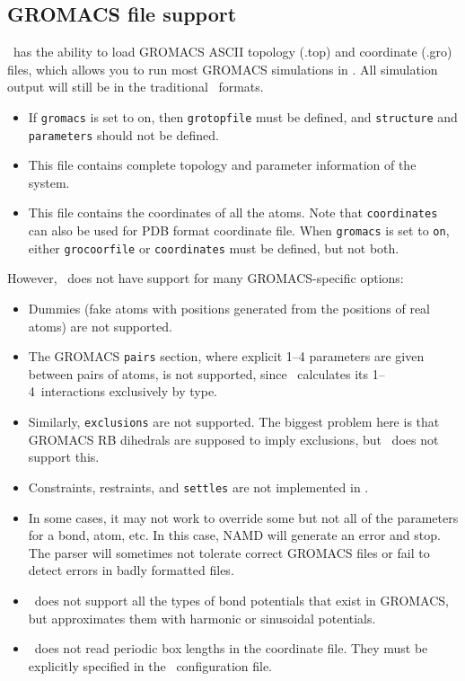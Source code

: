 \subsection{GROMACS file support}

\NAMD\ has the ability to load GROMACS ASCII topology (.top) and
coordinate (.gro) files, which allows you to run most GROMACS
simulations in \NAMD.  All simulation output will still be in the
traditional \NAMD\ formats.

\begin{itemize}
\item
{}
{
If {\tt gromacs} is set to on, then {\tt grotopfile} must be defined,
and {\tt structure} and {\tt parameters} should not be defined.
}
\item
{}
{
This file contains complete topology and parameter information of
the system.
}

\item
{}
{
This file contains the coordinates of all the atoms. Note that
{\tt coordinates} can also be used for PDB format coordinate
file. When {\tt gromacs} is set to {\tt on}, either {\tt grocoorfile}
or {\tt coordinates} must be defined, but not both.
}
\end{itemize}

\noindent However, \NAMD\ does not have support for many GROMACS-specific
options:

\begin{itemize}

\item Dummies (fake atoms with positions generated from the positions
of real atoms) are not supported.
\item The GROMACS \verb^pairs^ section, where explicit 1--4 parameters
are given between pairs of atoms, is not supported, since \NAMD\
calculates its 1--4~interactions exclusively by type.
\item Similarly, \verb^exclusions^ are not supported.  The biggest
problem here is that GROMACS RB dihedrals are supposed to imply
exclusions, but \NAMD\ does not support this.
\item Constraints, restraints, and \verb^settles^ are not
implemented in \NAMD.
\item In some cases, it may not work to override some but not all of
the parameters for a bond, atom, etc.  In this case, NAMD will
generate an error and stop.  The parser will sometimes not tolerate
correct GROMACS files or fail to detect errors in badly formatted
files.
\item \NAMD\ does not support all the types of bond potentials that
exist in GROMACS, but approximates them with harmonic or sinusoidal
potentials.
\item \NAMD\ does not read periodic box lengths in the
coordinate file. They must be explicitly specified in the \NAMD\
configuration file.

\end{itemize}


